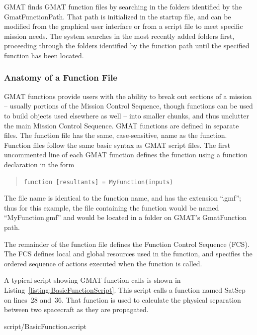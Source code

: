 GMAT finds GMAT function files by searching in the folders identified by the GmatFunctionPath.
That path is initialized in the startup file, and can be modified from the graphical user interface
or from a script file to meet specific mission needs.  The system searches in the most recently
added folders first, proceeding through the folders identified by the function path until the
specified function has been located.

\subsubsection{Anatomy of a Function File}

GMAT functions provide users with the ability to break out sections of a mission -- usually
portions of the Mission Control Sequence, though functions can be used to build objects used
elsewhere as well -- into smaller chunks, and thus unclutter the main Mission Control Sequence. 
GMAT functions are defined in separate files.  The function file has the same, case-sensitive,
name as the function.  Function files follow the same basic syntax as GMAT script files.  The first
uncommented line of each GMAT function defines the function using a function declaration in the
form

\begin{quote}
\texttt{function [resultants] = MyFunction(inputs)}
\end{quote}

\noindent The file name is identical to the function name, and has the extension
``.gmf''; thus for this example, the file containing the function would be named
``MyFunction.gmf'' and would be located in a folder on GMAT's GmatFunction path.

The remainder of the function file defines the Function Control Sequence (FCS).  The FCS defines
local and global resources used in the function, and specifies the ordered sequence of actions
executed when the function is called.

A typical script showing GMAT function calls is shown in Listing~\ref{listing:BasicFunctionScript}.
 This script calls a function named SatSep on lines~28 and~36.  That function is used to calculate
the physical separation between two spacecraft as they are propagated.  

\lstset{numbers=left}

{script/BasicFunction.script}
\lstset{numbers=none}

